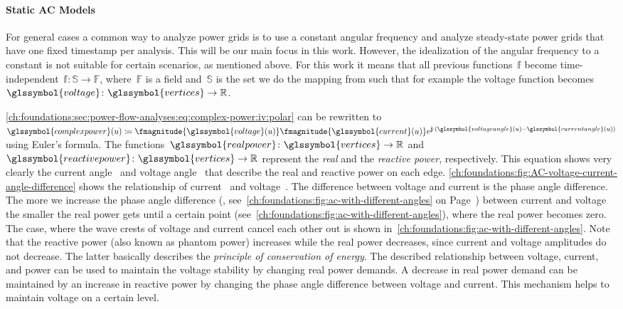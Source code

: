 \paragraph{Static AC Models}
% 
For general cases a common way to analyze power grids is to use a constant
angular frequency and analyze steady-state power grids that have one
fixed timestamp
per analysis. This will be our main focus in this work. However, the
idealization of the angular frequency to a constant is not suitable for certain
scenarios, as mentioned above. For this work it means that all previous
functions~$\mathbb{f}$ become time-independent~$\mathbb{f}\colon\mathbb{S}\to
\mathbb{F}$, where~$\mathbb{F}$ is a field and~$\mathbb{S}$ is the set we do the
mapping from such that for example the voltage function
becomes~$\glssymbol{voltage}\colon\glssymbol{vertices}\to\reals$.

\cref{ch:foundations:sec:power-flow-analyses:eq:complex-power:iv:polar} can be
rewritten to~$\glssymbol{complexpower}(\vertexa)\coloneqq\fmagnitude{\glssymbol{voltage}
(\vertexa)}\fmagnitude{\glssymbol{current}(\vertexa)}
e^{\imgPart\cdot(\glssymbol{voltageangle}(\vertexa) -
\glssymbol{currentangle}(\vertexa))}$ using Euler's formula. The
functions~$\glssymbol{realpower}\colon\glssymbol{vertices}\to\reals$
and~$\glssymbol{reactivepower}\colon\glssymbol{vertices}\to\reals$ represent the
\emph{real} and the \emph{reactive power}, respectively. This equation shows
very clearly the current angle~ and voltage
angle~ that describe the real and reactive power on each
edge. \cref{ch:foundations:fig:AC-voltage-current-angle-difference} shows the
relationship of current~ and voltage~. The
difference between voltage and current is the phase angle difference. The more
we increase the phase angle difference (\eg,
see~\cref{ch:foundations:fig:ac-with-different-angles} on
Page~\pageref{ch:foundations:fig:ac-with-different-angles}) between current and
voltage the smaller the real power gets until a certain point
(see~\cref{ch:foundations:fig:ac-with-different-angles}), where the
real power becomes zero. The case, where the wave crests of voltage and current
cancel each other out is shown
in~\cref{ch:foundations:fig:ac-with-different-angles}. Note that the
reactive power (also known as phantom power) increases while the real power
decreases, since current and voltage amplitudes do not decrease. The latter
basically describes the \emph{principle of conservation of energy}. The
described relationship between voltage, current, and power can be used to
maintain the voltage stability by changing real power demands. A decrease in
real power demand can be maintained by an increase in reactive power by changing
the phase angle difference between voltage and current. This mechanism helps to
maintain voltage on a certain level.

